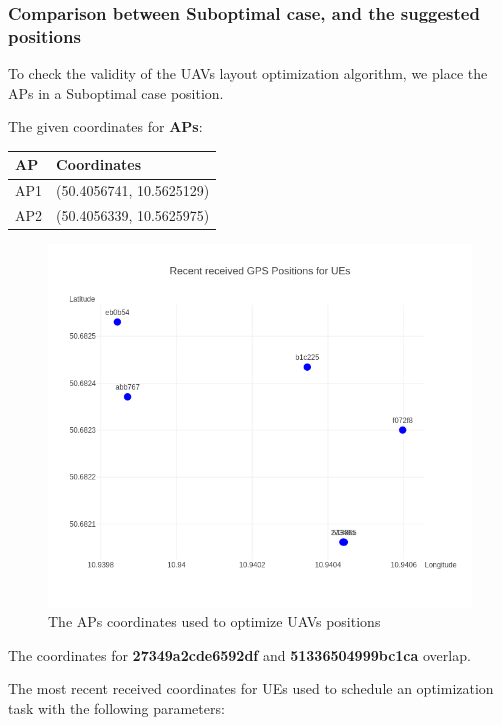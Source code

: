 \hypertarget{comparison-between-suboptimal-case-and-the-suggested-positions}{%
\subsubsection{Comparison between Suboptimal case, and the suggested
positions}\label{comparison-between-suboptimal-case-and-the-suggested-positions}}

To check the validity of the UAVs layout optimization algorithm, we
place the APs in a Suboptimal case position.

The given coordinates for \textbf{APs}:

\begin{longtable}[]{@{}ll@{}}
\toprule
AP & Coordinates\tabularnewline
\midrule
\endhead
AP1 & (50.4056741, 10.5625129)\tabularnewline
AP2 & (50.4056339, 10.5625975)\tabularnewline
\bottomrule
\end{longtable}

\begin{figure}[H]
	\centering
	\includegraphics[width=\linewidth,keepaspectratio]{images/Exp4_UEs_Location_to_optimize.png}
\caption{The APs coordinates used to optimize UAVs positions}
\end{figure}

The coordinates for \textbf{27349a2cde6592df} and
\textbf{51336504999bc1ca} overlap.

The most recent received coordinates for UEs used to schedule an
optimization task with the following parameters:

